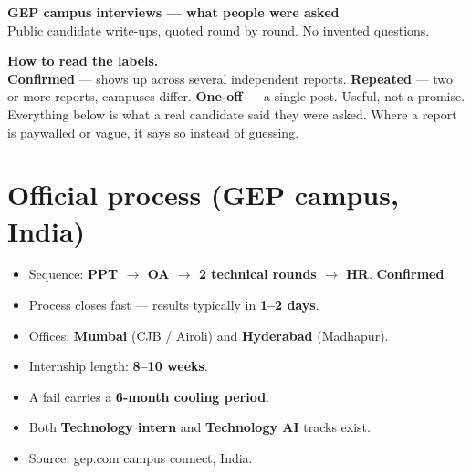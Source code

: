 \documentclass[11pt,a4paper]{article}
\newcommand{\tg}[1]{\textcolor{tag}{\textbf{\footnotesize #1}}}
\newcommand{\card}[1]{%
  \par\vspace{5pt}%
  \noindent\colorbox{soft}{%
    \parbox{\dimexpr\textwidth-2\fboxsep}{\vspace{6pt}#1\vspace{6pt}}%
  }\par\vspace{7pt}%
}
\begin{document}
\begin{center}
  {\LARGE\bfseries\color{accent}GEP campus interviews --- what people were asked}\\[5pt]
  {\color{muted}Public candidate write-ups, quoted round by round. No invented questions.}
\end{center}

\vspace{4pt}
\card{
\textbf{How to read the labels.}\\[3pt]
\tg{Confirmed} --- shows up across several independent reports.\quad
\tg{Repeated} --- two or more reports, campuses differ.\quad
\tg{One-off} --- a single post. Useful, not a promise.\\[4pt]
Everything below is what a real candidate said they were asked. Where a report is paywalled or vague, it says so instead of guessing.
}

\section{Official process (GEP campus, India)}
\begin{itemize}
  \item Sequence: \textbf{PPT $\rightarrow$ OA $\rightarrow$ 2 technical rounds $\rightarrow$ HR}. \tg{Confirmed}
  \item Process closes fast --- results typically in \textbf{1--2 days}.
  \item Offices: \textbf{Mumbai} (CJB / Airoli) and \textbf{Hyderabad} (Madhapur).
  \item Internship length: \textbf{8--10 weeks}.
  \item A fail carries a \textbf{6-month cooling period}.
  \item Both \textbf{Technology intern} and \textbf{Technology AI} tracks exist.
  \item Source: gep.com campus connect, India.
\end{itemize}
\end{document}
